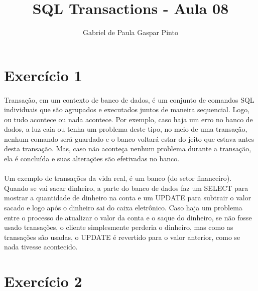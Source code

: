 \documentclass{article}
\title{SQL Transactions - Aula 08}
\author{Gabriel de Paula Gaspar Pinto}
\date{}
\begin{document}
\maketitle

\section*{Exercício 1}

    \paragraph{} Transação, em um contexto de banco de dados, é um conjunto de comandos SQL individuais que são agrupados e executados juntos de maneira sequencial. Logo, ou tudo acontece ou nada acontece. Por exemplo, caso haja um erro no banco de dados, a luz caia ou tenha um problema deste tipo, no meio de uma transação, nenhum comando será guardado e o banco voltará estar do jeito que estava antes desta transação. Mas, caso não aconteça nenhum problema durante a transação, ela é concluída e suas alterações são efetivadas no banco.
    \paragraph{} Um exemplo de transações da vida real, é um banco (do setor financeiro). Quando se vai sacar dinheiro, a parte do banco de dados faz um SELECT para mostrar a quantidade de dinheiro na conta e um UPDATE para subtrair o valor sacado e logo após o dinheiro sai do caixa eletrônico. Caso haja um problema entre o processo de atualizar o valor da conta e o saque do dinheiro, se não fosse usado transações, o cliente simplesmente perderia o dinheiro, mas como as transações são usadas, o UPDATE é revertido para o valor anterior, como se nada tivesse acontecido.
    
\section*{Exercício 2}
\end{document}
